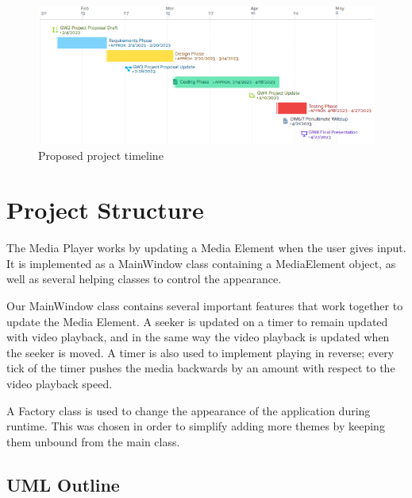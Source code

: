 \documentclass[10pt,conference,onecolumn,compsoc]{IEEEtran}
\begin{document}
\begin{figure}[H]
\begin{center}
\includegraphics[scale=1.5]{Project_Timeline.png}
\caption{Proposed project timeline}
\label{timeline}
\end{center}
\end{figure}

\section{Project Structure}
The Media Player works by updating a Media Element when the user gives input. It is implemented as a MainWindow class containing a MediaElement object, as well as several helping classes to control the appearance. \medskip

Our MainWindow class contains several important features that work together to update the Media Element. A seeker is updated on a timer to remain updated with video playback, and in the same way the video playback is updated when the seeker is moved. A timer is also used to implement playing in reverse; every tick of the timer pushes the media backwards by an amount with respect to the video playback speed.   \par
A Factory class is used to change the appearance of the application during runtime. This was chosen in order to simplify adding more themes by keeping them unbound from the main class.

\subsection{UML Outline}
\end{document}
